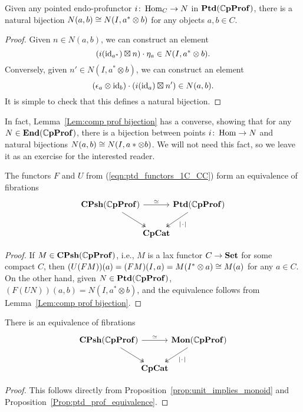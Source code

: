 \documentclass[11pt,oneside,article]{memoir}
\begin{document}
\begin{lemma}
      \label{Lem:comp prof bijection}
   Given any pointed endo-profunctor $i\colon\operatorname{Hom}_C\to N$ in $\mathbf{Ptd}(\mathbb{C}\mathbf{pProf})$, there is a natural
   bijection $N(a,b)\cong N(I,a^*\otimes b)$ for any objects $a,b\in C$.
\end{lemma}
\begin{proof}
   Given $n\in N(a,b)$, we can construct an element
   \[
      (i(\mathrm{id}_{a^*})\boxtimes n)\cdot\eta_a \in N(I,a^*\otimes b).
   \]
   Conversely, given $n'\in N(I,a^*\otimes b)$, we can construct an element
   \[
      (\epsilon_a\otimes\mathrm{id}_b)\cdot(i(\mathrm{id}_a)\boxtimes n') \in N(a,b).
   \]
   It is simple to check that this defines a natural bijection.
\end{proof}

In fact, Lemma~\ref{Lem:comp prof bijection} has a converse, showing that for any
$N\in\mathbf{End}(\mathbb{C}\mathbf{pProf})$, there is a bijection between points $i\colon \operatorname{Hom}\to N$ and natural
bijections $N(a,b)\cong N(I,a*\otimes b)$. We will not need this fact, so we leave it as an exercise
for the interested reader.

\begin{proposition}
      \label{Prop:ptd_prof_equivalence}
   The functors $F$ and $U$ from (\ref{eqn:ptd_functors_1C_CC}) form an equivalence of fibrations
   \[ \begin{tikzcd}[column sep=-.5em]
      \CPsh(\dCompProf) \ar[rr,"\equiv"] \ar[dr,two heads]
         && \Ptd(\dCompProf) \ar[dl,two heads,"\MOb"] \\
         & \CompCat &
   \end{tikzcd} \]
\end{proposition}
\begin{proof}
   If $M\in\mathbf{CPsh}(\mathbb{C}\mathbf{pProf})$, i.e., $M$ is a lax functor $C\to\mathbf{Set}$ for some compact $C$, then
   $(U(FM))(a)=(FM)(I,a)=M(I^*\otimes a)\cong M(a)$ for any $a\in C$. On the other hand, given
   $N\in\mathbf{Ptd}(\mathbb{C}\mathbf{pProf})$, $(F(UN))(a,b)=N(I,a^*\otimes b)$, and the equivalence follows from
   Lemma~\ref{Lem:comp prof bijection}.
\end{proof}

\begin{proposition}
      \label{Prop:mon_prof_equivalence}
   There is an equivalence of fibrations
   \[ \begin{tikzcd}[column sep=-.5em]
      \CPsh(\dCompProf) \ar[rr,"\equiv"] \ar[dr,two heads]
         && \Mon(\dCompProf) \ar[dl,two heads,"\MOb"] \\
         & \CompCat &
   \end{tikzcd} \]
\end{proposition}
\begin{proof}
   This follows directly from Proposition~\ref{prop:unit_implies_monoid} and
   Proposition~\ref{Prop:ptd_prof_equivalence}.
\end{proof}
\end{document}
